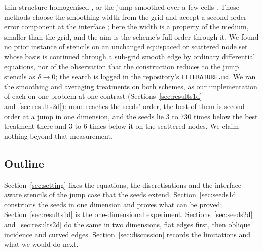 \documentclass[11pt]{amsart}
\theoremstyle{definition}
\theoremstyle{remark}
\begin{document}
thin structure homogenised
\cite{CapdevilleGuillotMarigo2010a,CapdevilleGuillotMarigo2010b}, or the
jump smoothed over a few cells
\cite{TornbergEngquist2003,TornbergEngquist2006,KoeneWittstenRobertsson2022}.
Those methods choose the smoothing width from the grid and accept a
second-order error component at the interface \cite{TornbergEngquist2006};
here the width is a property of the medium, smaller than the grid, and
the aim is the scheme's full order through it. We found no prior instance
of stencils on an unchanged equispaced or scattered node set whose basis
is continued through a sub-grid smooth edge by ordinary differential
equations, nor of the observation that the construction reduces to the
jump stencils as $\delta \to 0$; the search is logged in the repository's
\texttt{LITERATURE.md}. We ran the smoothing and averaging treatments on
both schemes, as our implementation of each on one problem at one
contrast (Sections~\ref{sec:results1d} and~\ref{sec:results2d}): none
reaches the seeds' order, the best of them is second order at a jump in
one dimension, and the seeds lie $3$ to $730$ times below the best
treatment there and $3$ to $6$ times below it on the scattered nodes. We
claim nothing beyond that measurement.

\subsection*{Outline}
Section~\ref{sec:setting} fixes the equations, the discretisations and
the interface-aware stencils of the jump case that the seeds extend.
Section~\ref{sec:seeds1d} constructs the seeds in one dimension and
proves what can be proved; Section~\ref{sec:results1d} is the
one-dimensional experiment. Sections~\ref{sec:seeds2d}
and~\ref{sec:results2d} do the same in two dimensions, flat edges first,
then oblique incidence and curved edges. Section~\ref{sec:discussion}
records the limitations and what we would do next.

\end{document}
